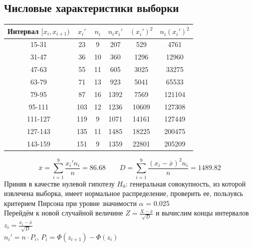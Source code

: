\documentclass[12pt,a4paper]{report}
\begin{document}
\subsection*{Числовые характеристики выборки}
\begin{tabular}{|c|c|c|c|c|c|}
	\hline
	Интервал $[x_i, x_{i+1})$ & $x_i'$ & $n_i$ & $n_ix_i'$ & $(x_i')^2$ & $n_i(x_i')^2$ \\
	\hline
	15-31                     & 23     & 9     & 207       & 529        & 4761          \\
	\hline
	31-47                     & 36     & 10    & 360       & 1296       & 12960         \\
	\hline
	47-63                     & 55     & 11    & 605       & 3025       & 33275         \\
	\hline
	63-79                     & 71     & 13    & 923       & 5041       & 65533         \\
	\hline
	79-95                     & 87     & 16    & 1392      & 7569       & 121104        \\
	\hline
	95-111                    & 103    & 12    & 1236      & 10609      & 127308        \\
	\hline
	111-127                   & 119    & 9     & 1071      & 14161      & 127449        \\
	\hline
	127-143                   & 135    & 11    & 1485      & 18225      & 200475        \\
	\hline
	143-159                   & 151    & 9     & 1359      & 22801      & 205209        \\
	\hline
\end{tabular}
$$\overline{x}=\sum_{i=1}^{9}\frac{x_i'n_i}{n}=86.68\qquad D=\sum_{i=1}^{9}\frac{(x_i-\overline{x})^2n_i}{n}=1489.82$$
Приняв в качестве нулевой гипотезу $H_0$: генеральная совокупность, из которой извлечена выборка, имеет нормальное распределение, проверить ее, пользуясь критерием Пирсона при уровне значимости $\alpha$ = 0.025\\
\hfill\break
Перейдём к новой случайной величине $Z=\frac{X-\overline{x}}{\sqrt{D}}$ и вычислим концы интервалов $z_i=\frac{x_i-\overline{x}}{\sqrt{D}}$\\
\hfill\break
$n_i'=n\cdot P_i$, $P_i=\Phi(z_{i + 1})-\Phi(z_i)$\\
\hfill\break
\end{document}
